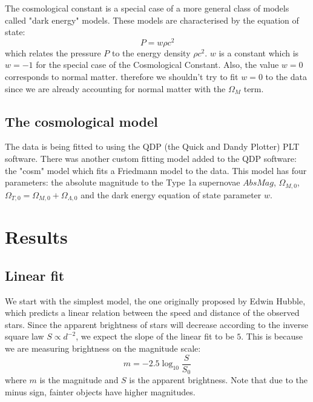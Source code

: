 \documentclass[11pt]{article}
\begin{document}
The cosmological constant is a special case of a more general class of models called "dark energy" models. These models are characterised by the equation of state:
\begin{equation}
	P = w \rho c^2
	\label{eq:dark}
\end{equation}
which relates the pressure $P$ to the energy density $\rho c^2$. $w$ is a constant which is $w = -1$ for the special case of the Cosmological Constant. Also, the value $w = 0$ corresponds to normal matter. therefore we shouldn't try to fit $w = 0$ to the data since we are already accounting for normal matter with the $\Omega_M$ term. 

\subsection{The cosmological model}
The data is being fitted to using the QDP (the Quick and Dandy Plotter) PLT software. There was another custom fitting model added to the QDP software: the "cosm" model which fits a Friedmann model to the data. This model has four parameters: the absolute magnitude to the Type 1a supernovae $AbsMag$, $\Omega_{M,0}$, $\Omega_{T,0} = \Omega_{M,0} + \Omega_{\Lambda,0}$ and the dark energy equation of state parameter $w$.

\section{Results}
\subsection{Linear fit} \label{sec:linear}
We start with the simplest model, the one originally proposed by Edwin Hubble, which predicts a linear relation between the speed and distance of the observed stars. Since the apparent brightness of stars will decrease according to the inverse square law $S \propto d^{-2}$, we expect the slope of the linear fit to be $5$. This is because we are measuring brightness on the magnitude scale:
\begin{equation}
	m = -2.5\log_{10}\frac{S}{S_0}
	\label{eq:mag}
\end{equation}
where $m$ is the magnitude and  $S$ is the apparent brightness. Note that due to the minus sign, fainter objects have higher magnitudes. 
\end{document}
